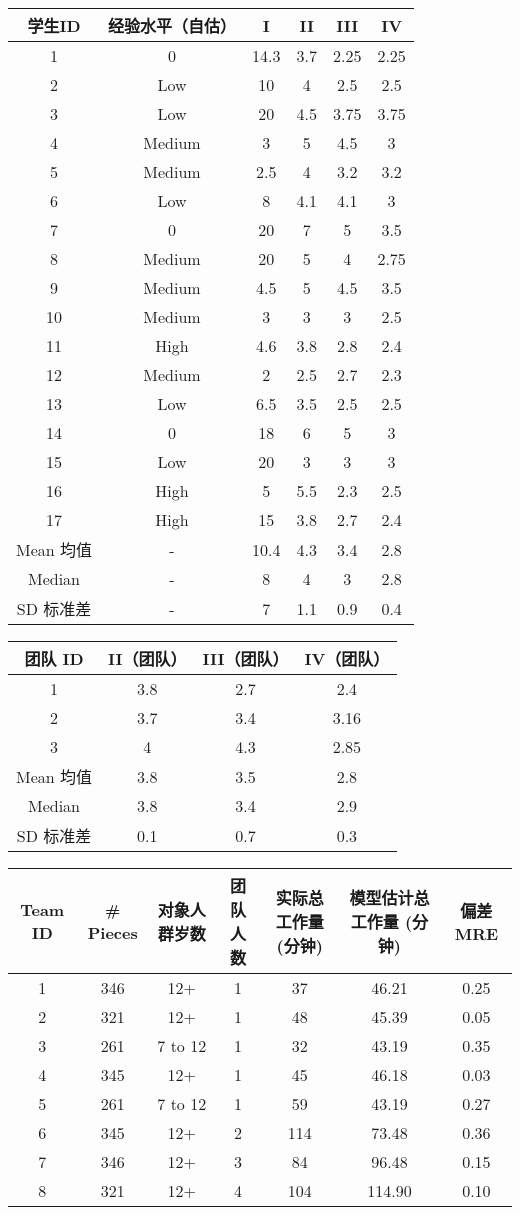\documentclass{book}        %
\begin{document}
\begin{tabular}{|c|c|c|c|c|c|}
\hline
学生ID&经验水平（自估）&I&II&III&IV\\
\hline
1&0&14.3&3.7&2.25&2.25\\
\hline
2&Low&10&4&2.5&2.5 \\
\hline
3&Low&20&4.5&3.75&3.75 \\
\hline
4&Medium&3&5&4.5&3\\
\hline
5&Medium&2.5&4&3.2&3.2\\
\hline
6&Low&8&4.1&4.1&3\\
\hline
7&0&20&7&5&3.5\\
\hline
8&Medium&20&5&4&2.75\\
\hline
9&Medium&4.5&5&4.5&3.5\\
\hline
10&Medium&3&3&3&2.5\\
\hline
11&High&4.6&3.8&2.8&2.4\\
\hline
12&Medium&2&2.5&2.7&2.3\\
\hline
13&Low&6.5&3.5&2.5&2.5\\
\hline
14&0&18&6&5&3\\
\hline
15&Low&20&3&3&3\\
\hline
16&High&5&5.5&2.3&2.5\\
\hline
17&High&15&3.8&2.7&2.4\\
\hline
Mean 均值&-&10.4&4.3&3.4&2.8\\
\hline
Median&-&8&4&3&2.8\\
\hline
SD 标准差&-&7&1.1&0.9&0.4\\
\hline
\end{tabular}

\begin{tabular}{|c|c|c|c|}
\hline
团队 ID&II（团队）&III（团队）&IV（团队）\\
\hline
1&3.8&2.7&2.4\\
\hline
2&3.7&3.4&3.16\\
\hline
3&4&4.3&2.85\\
\hline
Mean 均值&3.8&3.5&2.8\\
\hline
Median&3.8&3.4&2.9\\
\hline
SD 标准差&0.1&0.7&0.3\\
\hline
\end{tabular}



\begin{tabular}{|c|c|c|c|c|c|c|}
\hline
Team ID&\# Pieces&对象人群岁数&团队人数&实际总工作量(分钟)&模型估计总工作量 (分钟)&偏差 MRE \\
\hline
1&346&12+&1&37&46.21&0.25\\
\hline
2&321&12+&1&48&45.39&0.05\\
\hline
3&261&7 to 12&1&32&43.19&0.35\\
\hline
4&345&12+&1&45&46.18&0.03\\
\hline
5&261&7 to 12&1&59&43.19&0.27\\
\hline
6&345&12+&2&114&73.48&0.36\\
\hline
7&346&12+&3&84&96.48&0.15\\
\hline
8&321&12+&4&104&114.90&0.10\\
\hline
\end{tabular}
\end{document}
